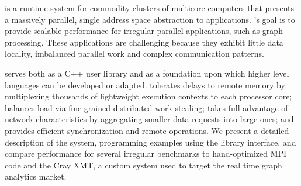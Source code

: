 \Grappa is a runtime system for commodity clusters of multicore computers that
presents a massively parallel, single address space abstraction to
applications. \Grappa's goal is to provide scalable performance for irregular
parallel applications, such as graph processing. These applications are
challenging because they exhibit little data locality, imbalanced parallel
work and complex communication patterns.

\Grappa serves both as a C++ user library and as a foundation upon which
higher level languages can be developed or adapted. \Grappa tolerates delays
to remote memory by multiplexing thousands of lightweight execution contexts
to each processor core; balances load via fine-grained distributed
work-stealing; takes full advantage of network characteristics by aggregating
smaller data requests into large ones; and provides efficient synchronization
and remote operations. We present a detailed description of the \Grappa
system, programming examples using the library interface, and compare
performance for several irregular benchmarks to hand-optimized MPI code and
the Cray XMT, a custom system used to target the real time graph analytics
market.
